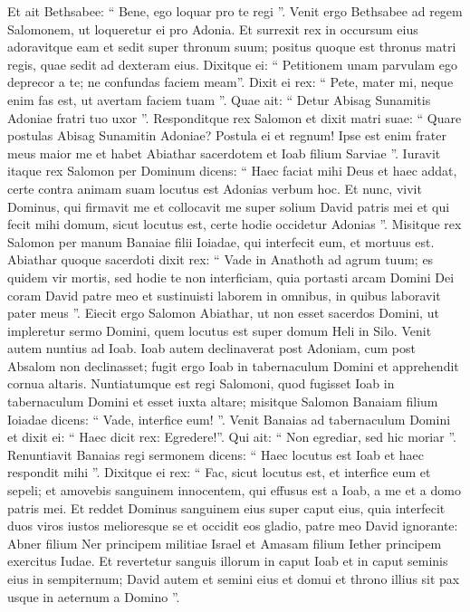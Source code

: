 \begin{biblechapter}
\begin{biblechapter}
\verse Et ait Bethsabee: “ Bene, ego loquar pro te regi ”.
 \verse Venit ergo Bethsabee ad regem Salomonem, ut loqueretur ei pro Adonia. Et surrexit rex in occursum eius adoravitque eam et sedit super thronum suum; positus quoque est thronus matri regis, quae sedit ad dexteram eius. 
\verse Dixitque ei: “ Petitionem unam parvulam ego deprecor a te; ne confundas faciem meam”. Dixit ei rex: “ Pete, mater mi, neque enim fas est, ut avertam faciem tuam ”. 
\verse Quae ait: “ Detur Abisag Sunamitis Adoniae fratri tuo uxor ”. 
\verse Responditque rex Salomon et dixit matri suae: “ Quare postulas Abisag Sunamitin Adoniae? Postula ei et regnum! Ipse est enim frater meus maior me et habet Abiathar sacerdotem et Ioab filium Sarviae ”. 
\verse Iuravit itaque rex Salomon per Dominum dicens: “ Haec faciat mihi Deus et haec addat, certe contra animam suam locutus est Adonias verbum hoc. 
\verse Et nunc, vivit Dominus, qui firmavit me et collocavit me super solium David patris mei et qui fecit mihi domum, sicut locutus est, certe hodie occidetur Adonias ”. 
\verse Misitque rex Salomon per manum Banaiae filii Ioiadae, qui interfecit eum, et mortuus est.
 \verse Abiathar quoque sacerdoti dixit rex: “ Vade in Anathoth ad agrum tuum; es quidem vir mortis, sed hodie te non interficiam, quia portasti arcam Domini Dei coram David patre meo et sustinuisti laborem in omnibus, in quibus laboravit pater meus ”. 
\verse Eiecit ergo Salomon Abiathar, ut non esset sacerdos Domini, ut impleretur sermo Domini, quem locutus est super domum Heli in Silo.
 \verse Venit autem nuntius ad Ioab. Ioab autem declinaverat post Adoniam, cum post Absalom non declinasset; fugit ergo Ioab in tabernaculum Domini et apprehendit cornua altaris. 
\verse Nuntiatumque est regi Salomoni, quod fugisset Ioab in tabernaculum Domini et esset iuxta altare; misitque Salomon Banaiam filium Ioiadae dicens: “ Vade, interfice eum! ”. 
\verse Venit Banaias ad tabernaculum Domini et dixit ei: “ Haec dicit rex: Egredere!”. Qui ait: “ Non egrediar, sed hic moriar ”. Renuntiavit Banaias regi sermonem dicens: “ Haec locutus est Ioab et haec respondit mihi ”. 
\verse Dixitque ei rex: “ Fac, sicut locutus est, et interfice eum et sepeli; et amovebis sanguinem innocentem, qui effusus est a Ioab, a me et a domo patris mei. 
\verse Et reddet Dominus sanguinem eius super caput eius, quia interfecit duos viros iustos melioresque se et occidit eos gladio, patre meo David ignorante: Abner filium Ner principem militiae Israel et Amasam filium Iether principem exercitus Iudae. 
\verse Et revertetur sanguis illorum in caput Ioab et in caput seminis eius in sempiternum; David autem et semini eius et domui et throno illius sit pax usque in aeternum a Domino ”. 

\end{biblechapter}
\end{biblechapter}
